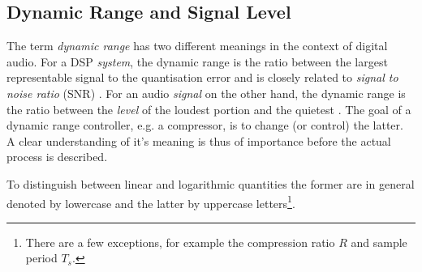 \documentclass[../main2.tex]{subfiles}
\begin{document}
\subsection{Dynamic Range and Signal Level}
The term \emph{dynamic range} has two different meanings in the context of digital audio. For a DSP \emph{system}, the dynamic range is the ratio between the largest representable signal to the quantisation error and is closely related to \emph{signal to noise ratio} (SNR)  \cite{wilson1993filter}. For an audio \emph{signal} on the other hand, the dynamic range is the ratio between the \emph{level} of the loudest portion and the quietest \cite{davis1989sound}. The goal of a dynamic range controller, e.g. a compressor, is to change (or control) the latter. A clear understanding of it's meaning is thus of importance before the actual process is described. 

To distinguish between linear and logarithmic quantities the former are in general denoted by lowercase and the latter by uppercase letters\footnote{There are a few exceptions, for example the compression ratio $R$ and sample period $T_s$.}.
\end{document}
